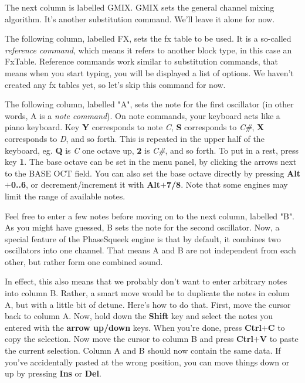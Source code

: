 \documentclass[12pt]{report}	%
\begin{document}
The next column is labelled GMIX. GMIX sets the general channel mixing algorithm. It's another substitution command. We'll leave it alone for now.

The following column, labelled FX, sets the fx table to be used. It is a so-called \textit{reference command}, which means it refers to another block type, in this case an FxTable. Reference commands work similar to substitution commands, that means when you start typing, you will be displayed a list of options. We haven't created any fx tables yet, so let's skip this command for now.

The following column, labelled "A", sets the note for the first oscillator (in other words, A is a \textit{note command}). On note commands, your keyboard acts like a piano keyboard. Key \textbf{Y} corresponds to note \textit{C}, \textbf{S} corresponds to \textit{C\#}, \textbf{X} corresponds to \textit{D}, and so forth. This is repeated in the upper half of the keyboard, eg. \textbf{Q} is \textit{C} one octave up, \textbf{2} is \textit{C\#}, and so forth. To put in a rest, press key \textbf{1}. The base octave can be set in the menu panel, by clicking the arrows next to the BASE OCT field. You can also set the base octave directly by pressing \textbf{Alt\(\bm{+}\)0..6}, or decrement/increment it with \textbf{Alt\(\bm{+}\)7/8}. Note that some engines may limit the range of available notes.

Feel free to enter a few notes before moving on to the next column, labelled "B". As you might have guessed, B sets the note for the second oscillator. Now, a special feature of the PhaseSqueek engine is that by default, it combines two oscillators into one channel. That means A and B are not independent from each other, but rather form one combined sound. 

In effect, this also means that we probably don't want to enter arbitrary notes into column B. Rather, a smart move would be to duplicate the notes in colum A, but with a little bit of detune. Here's how to do that. First, move the cursor back to column A. Now, hold down the \textbf{Shift} key and select the notes you entered with the \textbf{arrow up/down} keys. When you're done, press \textbf{Ctrl\(\bm{+}\)C} to copy the selection. Now move the cursor to column B and press \textbf{Ctrl\(\bm{+}\)V} to paste the current selection. Column A and B should now contain the same data. If you've accidentally pasted at the wrong position, you can move things down or up by pressing \textbf{Ins} or \textbf{Del}. 
\end{document}
